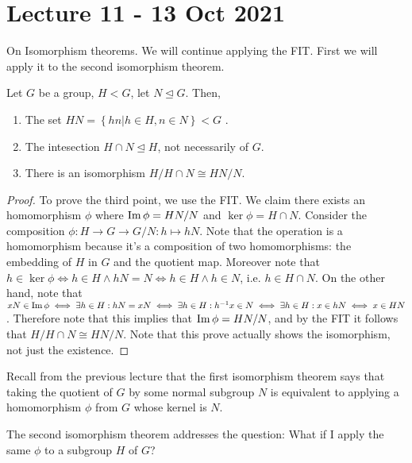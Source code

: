 \section{Lecture 11 - 13 Oct 2021}
On Isomorphism theorems. We will continue applying the FIT. First we will apply it to the
second isomorphism theorem.
\begin{theorem}
  Let $G$ be a group, $H<G$, let $N\trianglelefteq G$. Then,
  \begin{enumerate}
    \item The set $HN=\left\{ hn |h\in H,n\in N \right\} <G$ .
    \item The intesection $H\cap N \trianglelefteq H$, not necessarily of $G$.
    \item There is an isomorphism $H/H\cap N \cong HN/N$.
  \end{enumerate}
  \label{secondIso}
\end{theorem}
\begin{proof}
  To prove the third point, we use the FIT. We claim there exists an homomorphism $\phi$
  where $\operatorname{Im}\phi= HN/N$ and $\ker\phi = H\cap N$. Consider the composition $\phi:H\to
  G\to G/N: h\mapsto hN$. Note that the operation is a homomorphism because it's a
  composition of two homomorphisms: the embedding of $H$ in $G$ and the quotient map.
  Moreover note that $h\in\ker\phi \iff h\in H \land hN=N \iff h\in H \land h\in N$, i.e.
  $h\in H\cap N$. On the other hand, note that $xN\in\operatorname{Im}\phi \iff \exists h\in H : hN=xN
  \iff \exists h\in H : h^{-1}x\in N \iff \exists h\in H : x\in hN \iff x\in HN$.
  Therefore note that this implies that $\operatorname{Im}\phi = HN/N$, and by the FIT it follows
  that $H/H\cap N \cong HN/N$. Note that this prove actually shows the isomorphism, not
  just the existence.
\end{proof}
Recall from the previous lecture that the first isomorphism theorem says that taking the
quotient of $G$ by some normal subgroup $N$ is equivalent to applying a homomorphism $\phi$
from $G$ whose kernel is $N$.

The second isomorphism theorem addresses the question: What if I apply the same $\phi$ to
a subgroup $H$ of $G$? 

